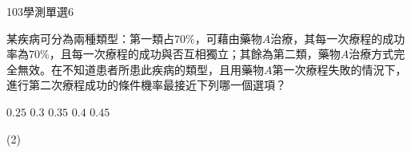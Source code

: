\begin{QUESTIONS}
\begin{QUESTION}
    \end{QUESTION}
    \begin{QUESTION}
        \begin{ExamInfo}{103}{學測}{單選}{6}
        \end{ExamInfo}
        \begin{ExamAnsRateInfo}{33}{55}{22}{22}
        \end{ExamAnsRateInfo}
        \begin{QBODY}
				某疾病可分為兩種類型：第一類占$70\%$，可藉由藥物$A$治療，其每一次療程的成功率為$70\%$，且每一次療程的成功與否互相獨立；其餘為第二類，藥物$A$治療方式完全無效。在不知道患者所患此疾病的類型，且用藥物$A$第一次療程失敗的情況下，進行第二次療程成功的條件機率最接近下列哪一個選項？
                \begin{QOPS}
    				\QOP $0.25$
    				\QOP $0.3$
    				\QOP $0.35$
    				\QOP $0.4$
    				\QOP $0.45$
                \end{QOPS}
        \end{QBODY}
        \begin{QFROMS}
        \end{QFROMS}
        \begin{QTAGS}\end{QTAGS}
        \begin{QANS}
            (2)
        \end{QANS}
        \begin{QSOLLIST}
        \end{QSOLLIST}
        \begin{QEMPTYSPACE}
        \end{QEMPTYSPACE}
    \end{QUESTION}
\end{QUESTIONS}
